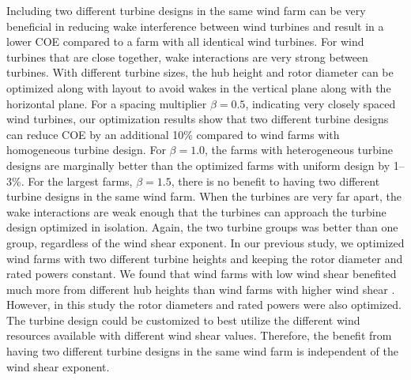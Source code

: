 Including two different turbine designs in the same wind farm can be very beneficial in reducing wake interference between wind turbines and result in a lower COE compared to a farm with all identical wind turbines. For wind turbines that are close together, wake interactions are very strong between turbines. With different turbine sizes, the hub height and rotor diameter can be optimized along with layout to avoid wakes in the vertical plane along with the horizontal plane. For a spacing multiplier $\beta=0.5$, indicating very closely spaced wind turbines, our optimization results show that two different turbine designs can reduce COE by an additional 10\% compared to wind farms with homogeneous turbine design. For $\beta=1.0$, the farms with heterogeneous turbine designs are marginally better than the optimized farms with uniform design by 1--3\%. For the largest farms, $\beta=1.5$, there is no benefit to having two different turbine designs in the same wind farm. When the turbines are very far apart, the wake interactions are weak enough that the turbines can approach the turbine design optimized in isolation.  Again, the two turbine groups was  better than one group, regardless of the wind shear exponent. In our previous study, we optimized wind farms with two different turbine heights and keeping the rotor diameter and rated powers constant. We found that wind farms with low wind shear benefited much more from different hub heights than wind farms with higher wind shear \citep{stanley2018}. However, in this study the rotor diameters and rated powers were also optimized. The turbine design could be customized to best utilize the different wind resources available with different wind shear values. Therefore, the benefit from having two different turbine designs in the same wind farm is independent of the wind shear exponent.

